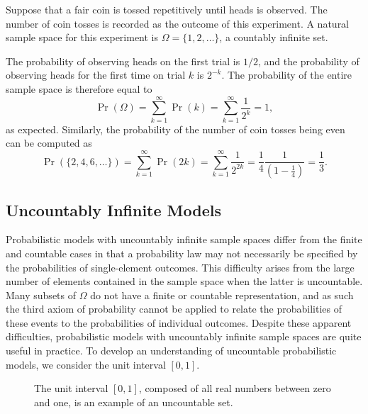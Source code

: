 \begin{example} \label{example:CoinTossSequence}
Suppose that a fair coin is tossed repetitively until heads is observed.
The number of coin tosses is recorded as the outcome of this experiment.
A natural sample space for this experiment is $\Omega = \{ 1, 2, \ldots \}$, a countably infinite set.

The probability of observing heads on the first trial is $1/2$, and the probability of observing heads for the first time on trial $k$ is $2^{-k}$.
The probability of the entire sample space is therefore equal to
\begin{equation*}
\Pr ( \Omega ) = \sum_{k=1}^{\infty} \Pr (k)
= \sum_{k=1}^{\infty} \frac{1}{2^k} = 1 ,
\end{equation*}
as expected.
Similarly, the probability of the number of coin tosses being even can be computed as
\begin{equation*}
\Pr ( \{ 2, 4, 6, \ldots \} )
= \sum_{k=1}^{\infty} \Pr (2k)
= \sum_{k = 1}^{\infty} \frac{1}{2^{2k}}
= \frac{1}{4} \frac{1}{ \left( 1 - \frac{1}{4} \right) }
= \frac{1}{3} .
\end{equation*}
\end{example}


\subsection{Uncountably Infinite Models}

Probabilistic models with uncountably infinite sample spaces differ from the finite and countable cases in that a probability law may not necessarily be specified by the probabilities of single-element outcomes.
This difficulty arises from the large number of elements contained in the sample space when the latter is uncountable.
Many subsets of $\Omega$ do not have a finite or countable representation, and as such the third axiom of probability cannot be applied to relate the probabilities of these events to the probabilities of individual outcomes.
Despite these apparent difficulties, probabilistic models with uncountably infinite sample spaces are quite useful in practice.
To develop an understanding of uncountable probabilistic models, we consider the unit interval $[0, 1]$.

\begin{figure}[htb!]
\begin{center}
\begin{footnotesize}
\end{footnotesize}
\caption{The unit interval $[0,1]$, composed of all real numbers between zero and one, is an example of an uncountable set.}
\end{center}
\end{figure}

